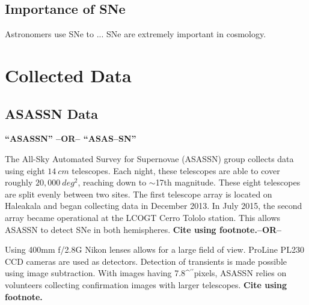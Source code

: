 \documentclass[aps,prb,twocolumn,superscriptaddress]{revtex4-1}
\def\arcsec{\ifmmode^{\prime\prime}\else$^{\prime\prime}$\fi}
\begin{document}
\subsection{Importance of SNe}

\indent Astronomers use SNe to ...
SNe are extremely important in cosmology.



\section{Collected Data}

\subsection{ASASSN Data}

{\bf ``ASASSN'' --OR-- ``ASAS--SN''\\}

\indent The All-Sky Automated Survey for Supernovae (ASASSN) group 
collects data using eight $14~cm$ telescopes. Each night, these  
telescopes are able to cover roughly $20,000~deg^{2}$, reaching 
down to $\sim$17th magnitude.
These eight telescopes are split evenly between two sites.
The first telescope array is located on Haleakala and began 
collecting data in December 2013. In July 2015, the second %
array became operational at the LCOGT Cerro Tololo station. 
This allows ASASSN to detect SNe in both hemispheres.
{\bf Cite using footnote.--OR--~\cite{asn_data}}

\indent Using 400mm f/2.8G Nikon lenses allows for a large field of 
view. ProLine PL230 CCD cameras are used as detectors. Detection of 
transients is made possible using image subtraction. With images 
having 7.8\arcsec pixels, ASASSN relies on volunteers collecting  
confirmation images with larger telescopes.
{\bf Cite using footnote.}
\end{document}
